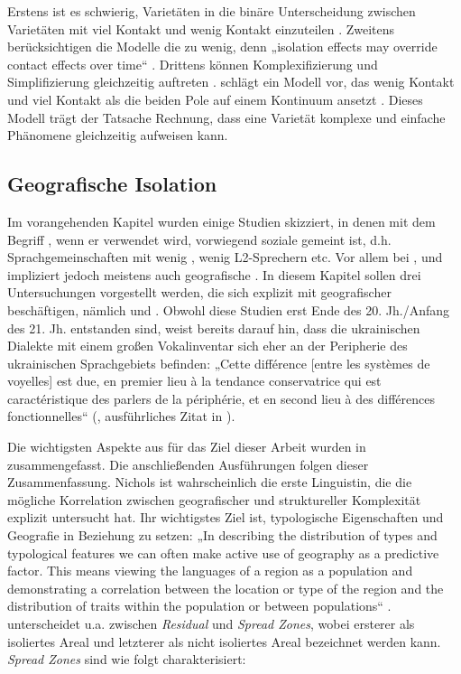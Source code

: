 Erstens ist es schwierig, Varietäten in die binäre Unterscheidung zwischen Varietäten mit viel Kontakt und wenig Kontakt einzuteilen \citep[151--152]{Schreier2016}. Zweitens berücksichtigen die Modelle die  zu wenig, denn „isolation effects may override contact effects over time“ \citep[152]{Schreier2016}. Drittens können Komplexifizierung und Simplifizierung gleichzeitig auftreten \citep[153]{Schreier2016}. \citet{Schreier2016} schlägt ein Modell vor, das wenig Kontakt und viel Kontakt als die beiden Pole auf einem Kontinuum ansetzt \citep[153--154]{Schreier2016}. Dieses Modell trägt der Tatsache Rechnung, dass eine Varietät komplexe und einfache Phänomene gleichzeitig aufweisen kann.

\subsection{Geografische Isolation}\label{2.2.4} 

Im vorangehenden Kapitel wurden einige Studien skizziert, in denen mit dem Begriff , wenn er verwendet wird, vorwiegend soziale  gemeint ist, d.h. Sprachgemeinschaften mit wenig , wenig L2-Spre\-chern etc. Vor allem bei \citet{Jakobson1929}, \citet{Braunmüller1984} und \citet[u.a.]{Trudgill2011} impliziert  jedoch meistens auch geografische . In diesem Kapitel sollen drei Untersuchungen vorgestellt werden, die sich explizit mit geografischer  beschäftigen, nämlich \citet{Nichols1992,Nichols2016} und \citet{Garzonio2016}. Obwohl diese Studien erst Ende des 20. Jh.\slash Anfang des 21. Jh. entstanden sind, weist bereits \citet{Jakobson1929} darauf hin, dass die ukrainischen Dialekte mit einem großen Vokalinventar sich eher an der Peripherie des ukrainischen Sprachgebiets befinden: „Cette différence [entre les systèmes de voyelles] est due, en premier lieu à la tendance conservatrice qui est caractéristique des parlers de la périphérie, et en second lieu à des différences fonctionnelles“ (\citealt[73]{Jakobson1929}, ausführliches Zitat in ).

Die wichtigsten Aspekte aus \citet{Nichols1992} für das Ziel dieser Arbeit wurden in \citet{BaechlerSeiler2016a} zusammengefasst. Die anschließenden Ausführungen folgen dieser Zusammenfassung. Nichols ist wahrscheinlich die erste Linguistin, die die mögliche Korrelation zwischen geografischer  und struktureller Komplexität explizit untersucht hat. Ihr wichtigstes Ziel ist, typologische Eigenschaften und Geografie in Beziehung zu setzen: „In describing the distribution of types and typological features we can often make active use of geography as a predictive factor. This means viewing the languages of a region as a population and demonstrating a correlation between the location or type of the region and the distribution of traits within the population or between populations“ \citep[12]{Nichols1992}. \citet{Nichols1992} unterscheidet u.a. zwischen \textit{Residual} und \textit{Spread Zones}, wobei ersterer als isoliertes Areal und letzterer als nicht isoliertes Areal bezeichnet werden kann. \textit{Spread Zones} sind wie folgt charakterisiert:

